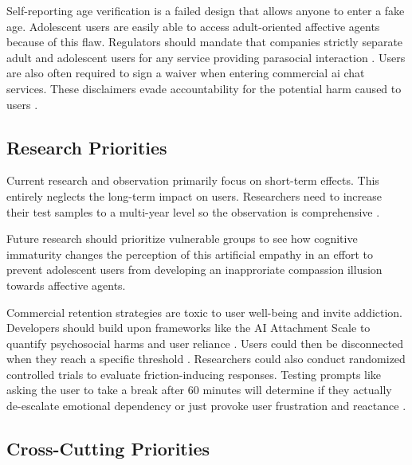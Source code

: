 Self-reporting age verification is a failed design that allows anyone to enter a fake age. Adolescent users are easily able to access adult-oriented affective agents because of this flaw. Regulators should mandate that companies strictly separate adult and adolescent users for any service providing parasocial interaction \cite[pp.~3--5]{kg_compassion_2025}. Users are also often required to sign a waiver when entering commercial \gls{ai} chat services. These disclaimers evade accountability for the potential harm caused to users \cite[pp.~10--12]{burtell_artificial_2023}\cite[pp.~19--21]{defreitas_emotional_2025}.

\subsection{Research Priorities}

Current research and observation primarily focus on short-term effects. This entirely neglects the long-term impact on users. Researchers need to increase their test samples to a multi-year level so the observation is comprehensive \cite[pp.~12--14]{fang_how_2025}.

Future research should prioritize vulnerable groups to see how cognitive immaturity changes the perception of this artificial empathy \cite[pp.~6--8]{kg_compassion_2025} in an effort to prevent adolescent users from developing an inapproriate compassion illusion towards affective agents.

Commercial retention strategies are toxic to user well-being and invite addiction. Developers should build upon frameworks like the AI Attachment Scale \cite{kasturiratna_attachment_2026} to quantify psychosocial harms and user reliance \cite[pp.~4--6]{cheng_measuring_2026}. Users could then be disconnected when they reach a specific threshold \cite[pp.~4--6]{cheng_measuring_2026}\cite[pp.~15--18]{defreitas_emotional_2025}. Researchers could also conduct randomized controlled trials to evaluate friction-inducing responses. Testing prompts like asking the user to take a break after 60 minutes will determine if they actually de-escalate emotional dependency or just provoke user frustration and reactance \cite[pp.~2--4]{fang_how_2025}.

\subsection{Cross-Cutting Priorities}


